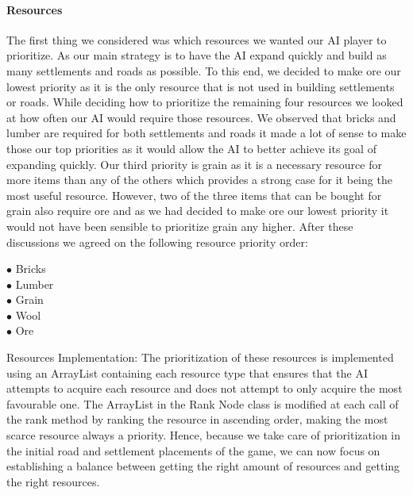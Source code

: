 \documentclass[a4paper,doc]{apa6}
\begin{document}
\paragraph{Resources}
The first thing we considered was which resources we wanted our AI player to prioritize. As our main strategy is to have the AI expand quickly and build as many settlements and roads as possible. To this end, we decided to make ore our lowest priority as it is the only resource that is not used in building settlements or roads.
While deciding how to prioritize the remaining four resources we looked at how often our AI would require those resources. We observed that bricks and lumber are required for both settlements and roads it made a lot of sense to make those our top priorities as it would allow the AI to better achieve its goal of expanding quickly. Our third priority is grain as it is a necessary resource for more items than any of the others which provides a strong case for it being the most useful resource. However, two of the three items that can be bought for grain also require ore and as we had decided to make ore our lowest priority it would not have been sensible to prioritize grain any higher. After these discussions we agreed on the following resource priority order:

\begin{description}
\item[$\bullet$ Bricks]
\item[$\bullet$ Lumber]
\item[$\bullet$ Grain]
\item[$\bullet$ Wool]
\item[$\bullet$ Ore]
\end{description}

Resources Implementation:
The prioritization of these resources is implemented using an ArrayList containing each resource type that ensures that the AI attempts to acquire each resource and does not attempt to only acquire the most favourable one. The ArrayList in the Rank Node class is modified at each call of the rank method by ranking the resource in ascending order, making the most scarce resource always a priority. Hence, because we take care of prioritization in the initial road and settlement placements of the game, we can now focus on establishing a balance between getting the right amount of resources and getting the right resources.
\end{document}
